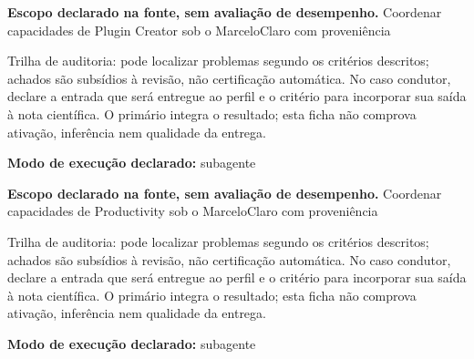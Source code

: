 
\begin{descricao}
\textbf{Escopo declarado na fonte, sem avaliação de desempenho.}
Coordenar capacidades de Plugin Creator sob o MarceloClaro com proveniência
\end{descricao}

\begin{funcao}
Trilha de auditoria: pode localizar problemas segundo os critérios descritos; achados são subsídios à revisão, não certificação automática. No caso condutor, declare a entrada que será entregue ao perfil e o critério para incorporar sua saída à nota científica. O primário integra o resultado; esta ficha não comprova ativação, inferência nem qualidade da entrega.
\end{funcao}

\begin{arquitetura}
\textbf{Modo de execução declarado:} subagente
\end{arquitetura}


\begin{descricao}
\textbf{Escopo declarado na fonte, sem avaliação de desempenho.}
Coordenar capacidades de Productivity sob o MarceloClaro com proveniência
\end{descricao}

\begin{funcao}
Trilha de auditoria: pode localizar problemas segundo os critérios descritos; achados são subsídios à revisão, não certificação automática. No caso condutor, declare a entrada que será entregue ao perfil e o critério para incorporar sua saída à nota científica. O primário integra o resultado; esta ficha não comprova ativação, inferência nem qualidade da entrega.
\end{funcao}

\begin{arquitetura}
\textbf{Modo de execução declarado:} subagente
\end{arquitetura}

